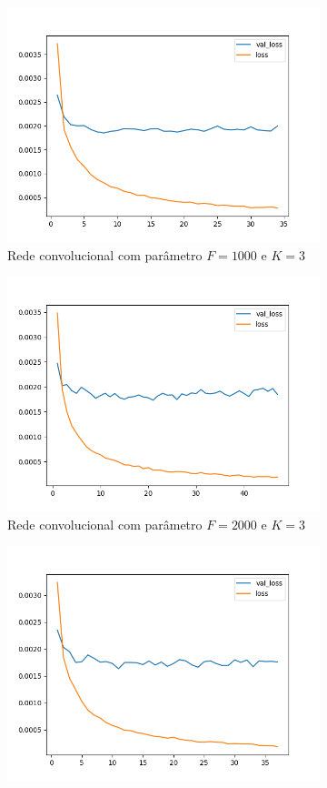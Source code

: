 \begin{figure}[H]
\begin{subfigure}{.5\textwidth}
  \centering
  \includegraphics[width=.8\linewidth]{figuras/ape-ajustes-hiper-parametros/cnn-1000-k-3.png}
  \caption{Rede convolucional com parâmetro $F = 1000$ e $K = 3$}
  \label{fig:cnn-1000-k-3}
\end{subfigure}
\begin{subfigure}{.5\textwidth}
  \centering
  \includegraphics[width=.8\linewidth]{figuras/ape-ajustes-hiper-parametros/cnn-2000-k-3.png}
  \caption{Rede convolucional com parâmetro $F = 2000$ e $K = 3$}
  \label{fig:cnn-2000-k-3}
\end{subfigure}
\begin{subfigure}{.5\textwidth}
  \centering
  \includegraphics[width=.8\linewidth]{figuras/ape-ajustes-hiper-parametros/cnn-4000-k-3.png}

\end{subfigure}
\end{figure}
